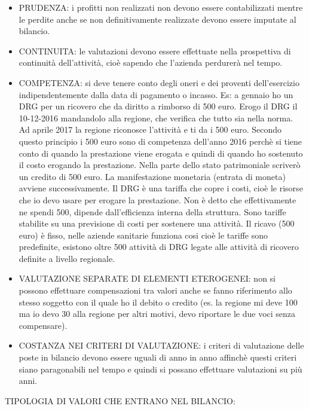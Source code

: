 \documentclass[]{article}
\begin{document}
\begin{itemize}
\item
  PRUDENZA: i profitti non realizzati non devono essere contabilizzati
  mentre le perdite anche se non definitivamente realizzate devono
  essere imputate al bilancio.
\item
  CONTINUITA: le valutazioni devono essere effettuate nella prospettiva
  di continuità dell'attività, cioè sapendo che l'azienda perdurerà nel
  tempo.
\item
  COMPETENZA: si deve tenere conto degli oneri e dei proventi
  dell'esercizio indipendentemente dalla data di pagamento o incasso.
  Es: a gennaio ho un DRG per un ricovero che da diritto a rimborso di
  500 euro. Erogo il DRG il 10-12-2016 mandandolo alla regione, che
  verifica che tutto sia nella norma. Ad aprile 2017 la regione
  riconosce l'attività e ti da i 500 euro. Secondo questo principio i
  500 euro sono di competenza dell'anno 2016 perchè si tiene conto di
  quando la prestazione viene erogata e quindi di quando ho sostenuto il
  costo erogando la prestazione. Nella parte dello stato patrimoniale
  scriverò un credito di 500 euro. La manifestazione monetaria (entrata
  di moneta) avviene successivamente. Il DRG è una tariffa che copre i
  costi, cioè le risorse che io devo usare per erogare la prestazione.
  Non è detto che effettivamente ne spendi 500, dipende dall'efficienza
  interna della struttura. Sono tariffe stabilite su una previsione di
  costi per sostenere una attività. Il ricavo (500 euro) è fisso, nelle
  aziende sanitarie funziona cosi cioè le tariffe sono predefinite,
  esistono oltre 500 attività di DRG legate alle attività di ricovero
  definite a livello regionale.
\item
  VALUTAZIONE SEPARATE DI ELEMENTI ETEROGENEI: non si possono effettuare
  compensazioni tra valori anche se fanno riferimento allo stesso
  soggetto con il quale ho il debito o credito (es. la regione mi deve
  100 ma io devo 30 alla regione per altri motivi, devo riportare le due
  voci senza compensare).
\item
  COSTANZA NEI CRITERI DI VALUTAZIONE: i criteri di valutazione delle
  poste in bilancio devono essere uguali di anno in anno affinchè questi
  criteri siano paragonabili nel tempo e quindi si possano effettuare
  valutazioni su più anni.
\end{itemize}

TIPOLOGIA DI VALORI CHE ENTRANO NEL BILANCIO:
\end{document}
